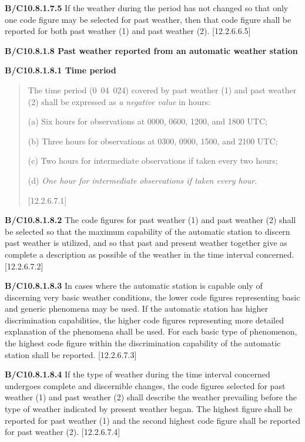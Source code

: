 \textbf{B/C10.8.1.7.5} If the weather during the period has not changed so that only one code figure may be selected for past weather, then that code figure shall be reported for both past weather (1) and past weather (2). {[}12.2.6.6.5{]}

\textbf{B/C10.8.1.8 Past weather reported from an automatic weather station}

\textbf{B/C10.8.1.8.1 Time period}

\begin{quote}
The time period (0~04~024) covered by past weather (1) and past weather (2) shall be expressed as \emph{a negative value} in hours:

(a) Six hours for observations at 0000, 0600, 1200, and 1800 UTC;

(b) Three hours for observations at 0300, 0900, 1500, and 2100 UTC;

(c) Two hours for intermediate observations if taken every two hours;

(d) \emph{One hour for intermediate observations if taken every hour}.

{[}12.2.6.7.1{]}
\end{quote}

\textbf{B/C10.8.1.8.2} The code figures for past weather (1) and past weather (2) shall be selected so that the maximum capability of the automatic station to discern past weather is utilized, and so that past and present weather together give as complete a description as possible of the weather in the time interval concerned. {[}12.2.6.7.2{]}

\textbf{B/C10.8.1.8.3} In cases where the automatic station is capable only of discerning very basic weather conditions, the lower code figures representing basic and generic phenomena may be used. If the automatic station has higher discrimination capabilities, the higher code figures representing more detailed explanation of the phenomena shall be used. For each basic type of phenomenon, the highest code figure within the discrimination capability of the automatic station shall be reported. {[}12.2.6.7.3{]}

\textbf{B/C10.8.1.8.4} If the type of weather during the time interval concerned undergoes complete and discernible changes, the code figures selected for past weather (1) and past weather (2) shall describe the weather prevailing before the type of weather indicated by present weather began. The highest figure shall be reported for past weather (1) and the second highest code figure shall be reported for past weather (2). {[}12.2.6.7.4{]}

